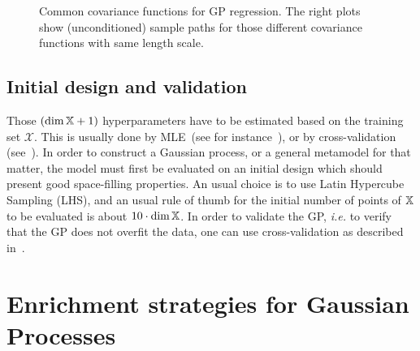 \documentclass[../../Main_ManuscritThese.tex]{subfiles}
\newcommand\imgpath{/home/victor/acadwriting/Manuscrit/Text/Chapter4/img/}
\begin{document}
  
\begin{figure}[ht]
  \centering
  
  \caption[Common covariance functions for GP]{\label{fig:cov_fc_examples} Common covariance functions for GP regression. The right plots show (unconditioned) sample paths for those different covariance functions with same length scale.}
\end{figure}

\subsection{Initial design and validation}

Those $(\dim \mathbb{X} + 1)$ hyperparameters have to be estimated based on the training set $\mathcal{X}$. This is usually done by MLE~(see for instance~\cite{ribaud_robustness_2019}), or by cross-validation (see~\cite{ginsbourger_note_2009}).
In order to construct a Gaussian process, or a general metamodel for that matter, the model must first be evaluated on an initial design which should present good space-filling properties. An usual choice is to use Latin Hypercube Sampling (LHS), and an usual rule of thumb for the initial number of points of $\mathbb{X}$ to be evaluated is about $10\cdot\dim \mathbb{X} $. In order to validate the GP, \emph{i.e.} to verify that the GP does not overfit the data, one can use cross-validation as described in~\cite{dubrule_cross_1983}.



\section{Enrichment strategies for Gaussian Processes}
\label{sec:enrichment_strategies}
\end{document}

